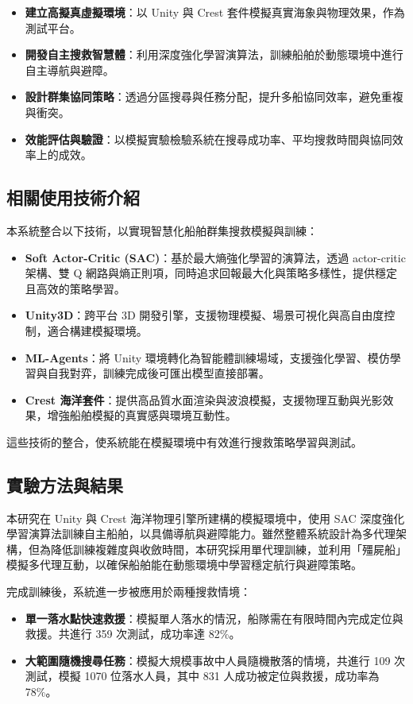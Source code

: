 \documentclass[12pt,a4paper]{article}
\begin{document}
\begin{itemize}
\item \textbf{建立高擬真虛擬環境}：以 Unity 與 Crest 套件模擬真實海象與物理效果，作為測試平台。
\item \textbf{開發自主搜救智慧體}：利用深度強化學習演算法，訓練船舶於動態環境中進行自主導航與避障。
\item \textbf{設計群集協同策略}：透過分區搜尋與任務分配，提升多船協同效率，避免重複與衝突。
\item \textbf{效能評估與驗證}：以模擬實驗檢驗系統在搜尋成功率、平均搜救時間與協同效率上的成效。
\end{itemize}

\subsection{相關使用技術介紹}

本系統整合以下技術，以實現智慧化船舶群集搜救模擬與訓練：

\begin{itemize}
	\item \textbf{Soft Actor-Critic (SAC)}：基於最大熵強化學習的演算法，透過 actor-critic 架構、雙 Q 網路與熵正則項，同時追求回報最大化與策略多樣性，提供穩定且高效的策略學習。
	\item \textbf{Unity3D}：跨平台 3D 開發引擎，支援物理模擬、場景可視化與高自由度控制，適合構建模擬環境。
	\item \textbf{ML-Agents}：將 Unity 環境轉化為智能體訓練場域，支援強化學習、模仿學習與自我對弈，訓練完成後可匯出模型直接部署。
	 \item \textbf{Crest 海洋套件}：提供高品質水面渲染與波浪模擬，支援物理互動與光影效果，增強船舶模擬的真實感與環境互動性。
\end{itemize}

這些技術的整合，使系統能在模擬環境中有效進行搜救策略學習與測試。

\subsection{實驗方法與結果}
本研究在 Unity 與 Crest 海洋物理引擎所建構的模擬環境中，使用 SAC 深度強化學習演算法訓練自主船舶，以具備導航與避障能力。雖然整體系統設計為多代理架構，但為降低訓練複雜度與收斂時間，本研究採用單代理訓練，並利用「殭屍船」模擬多代理互動，以確保船舶能在動態環境中學習穩定航行與避障策略。

完成訓練後，系統進一步被應用於兩種搜救情境：  
\begin{itemize}
    \item \textbf{單一落水點快速救援}：模擬單人落水的情況，船隊需在有限時間內完成定位與救援。共進行 359 次測試，成功率達 82\%。  
    \item \textbf{大範圍隨機搜尋任務}：模擬大規模事故中人員隨機散落的情境，共進行 109 次測試，模擬 1070 位落水人員，其中 831 人成功被定位與救援，成功率為 78\%。  
\end{itemize}
\end{document}
